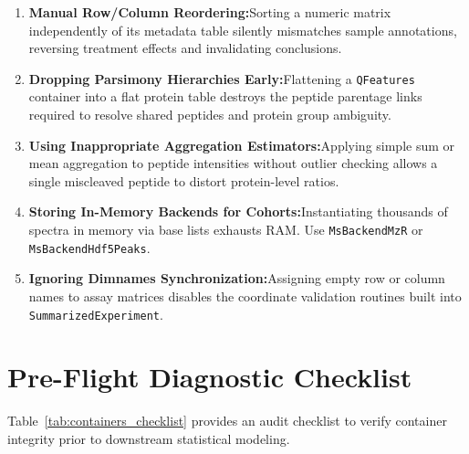 \documentclass[11pt,twoside,openright]{book}
\begin{document}
\begin{enumerate}
    \item \textbf{Manual Row/Column Reordering:}\enspace Sorting a numeric matrix independently of its metadata table silently mismatches sample annotations, reversing treatment effects and invalidating conclusions.
    \item \textbf{Dropping Parsimony Hierarchies Early:}\enspace Flattening a \texttt{QFeatures} container into a flat protein table destroys the peptide parentage links required to resolve shared peptides and protein group ambiguity.
    \item \textbf{Using Inappropriate Aggregation Estimators:}\enspace Applying simple sum or mean aggregation to peptide intensities without outlier checking allows a single miscleaved peptide to distort protein-level ratios.
    \item \textbf{Storing In-Memory Backends for Cohorts:}\enspace Instantiating thousands of spectra in memory via base lists exhausts RAM. Use \texttt{MsBackendMzR} or \texttt{MsBackendHdf5Peaks}.
    \item \textbf{Ignoring Dimnames Synchronization:}\enspace Assigning empty row or column names to assay matrices disables the coordinate validation routines built into \texttt{SummarizedExperiment}.
\end{enumerate}

\section{Pre-Flight Diagnostic Checklist}
\label{sec:diagnostic_checklist}

Table~\ref{tab:containers_checklist} provides an audit checklist to verify container integrity prior to downstream statistical modeling.
\end{document}

